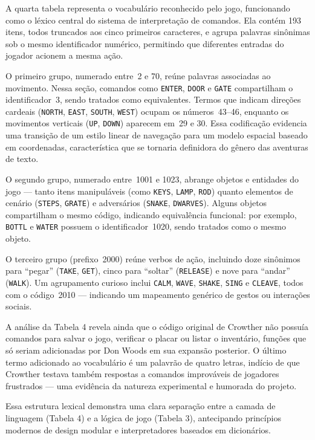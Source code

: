 \documentclass[12pt,a4paper]{article}
\begin{document}
A quarta tabela representa o vocabulário reconhecido pelo jogo, funcionando como o léxico central do sistema de interpretação de comandos. Ela contém 193 itens, todos truncados aos cinco primeiros caracteres, e agrupa palavras sinônimas sob o mesmo identificador numérico, permitindo que diferentes entradas do jogador acionem a mesma ação.  

O primeiro grupo, numerado entre~2 e 70, reúne palavras associadas ao movimento. Nessa seção, comandos como \texttt{ENTER}, \texttt{DOOR} e \texttt{GATE} compartilham o identificador~3, sendo tratados como equivalentes. Termos que indicam direções cardeais (\texttt{NORTH}, \texttt{EAST}, \texttt{SOUTH}, \texttt{WEST}) ocupam os números~43–46, enquanto os movimentos verticais (\texttt{UP}, \texttt{DOWN}) aparecem em~29 e 30. Essa codificação evidencia uma transição de um estilo linear de navegação para um modelo espacial baseado em coordenadas, característica que se tornaria definidora do gênero das aventuras de texto.

O segundo grupo, numerado entre~1001 e 1023, abrange objetos e entidades do jogo — tanto itens manipuláveis (como \texttt{KEYS}, \texttt{LAMP}, \texttt{ROD}) quanto elementos de cenário (\texttt{STEPS}, \texttt{GRATE}) e adversários (\texttt{SNAKE}, \texttt{DWARVES}). Alguns objetos compartilham o mesmo código, indicando equivalência funcional: por exemplo, \texttt{BOTTL} e \texttt{WATER} possuem o identificador~1020, sendo tratados como o mesmo objeto.  

O terceiro grupo (prefixo~2000) reúne verbos de ação, incluindo doze sinônimos para “pegar” (\texttt{TAKE}, \texttt{GET}), cinco para “soltar” (\texttt{RELEASE}) e nove para “andar” (\texttt{WALK}). Um agrupamento curioso inclui \texttt{CALM}, \texttt{WAVE}, \texttt{SHAKE}, \texttt{SING} e \texttt{CLEAVE}, todos com o código~2010 — indicando um mapeamento genérico de gestos ou interações sociais.  

A análise da Tabela 4 revela ainda que o código original de Crowther não possuía comandos para salvar o jogo, verificar o placar ou listar o inventário, funções que só seriam adicionadas por Don Woods em sua expansão posterior. O último termo adicionado ao vocabulário é um palavrão de quatro letras, indício de que Crowther testava também respostas a comandos improváveis de jogadores frustrados — uma evidência da natureza experimental e humorada do projeto.  

Essa estrutura lexical demonstra uma clara separação entre a camada de linguagem (Tabela 4) e a lógica de jogo (Tabela 3), antecipando princípios modernos de design modular e interpretadores baseados em dicionários.

\newpage

\printbibliography
\end{document}
